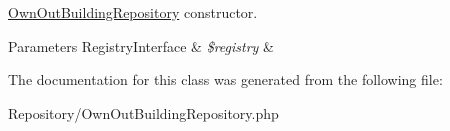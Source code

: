 \mbox{\hyperlink{class_app_1_1_repository_1_1_own_out_building_repository}{Own\+Out\+Building\+Repository}} constructor. 
\begin{DoxyParams}[1]{Parameters}
Registry\+Interface & {\em \$registry} & \\
\hline
\end{DoxyParams}


The documentation for this class was generated from the following file\+:\begin{DoxyCompactItemize}
\item 
Repository/Own\+Out\+Building\+Repository.\+php\end{DoxyCompactItemize}
